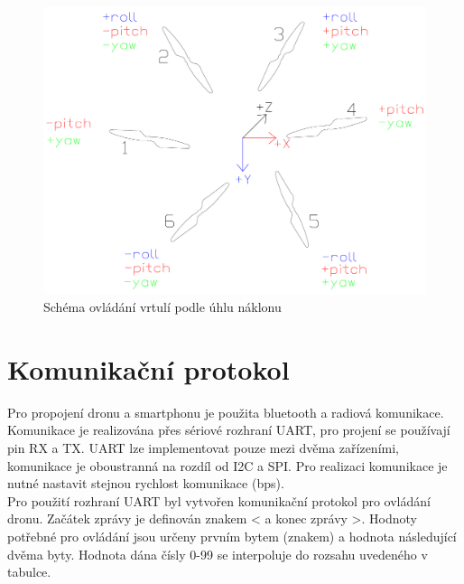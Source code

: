 \begin{figure}[H]
	\centering
	\includegraphics[width=12cm]{pictures/pid.pdf}
	\caption{Schéma ovládání vrtulí podle úhlu náklonu}
\end{figure}

\section{Komunikační protokol}
Pro propojení dronu a smartphonu je použita bluetooth a radiová komunikace. Komunikace je realizována přes sériové rozhraní UART, pro projení se používají pin RX a TX. UART lze implementovat pouze mezi dvěma zařízeními, komunikace je oboustranná na rozdíl od I2C a SPI. Pro realizaci komunikace je nutné nastavit stejnou rychlost komunikace (bps).\\
Pro použití rozhraní UART byl vytvořen komunikační protokol pro ovládání dronu. Začátek zprávy je definován znakem < a konec zprávy >. Hodnoty potřebné pro ovládání jsou určeny prvním bytem (znakem) a hodnota následující dvěma byty. Hodnota dána čísly 0-99 se interpoluje do rozsahu uvedeného v tabulce.\\

